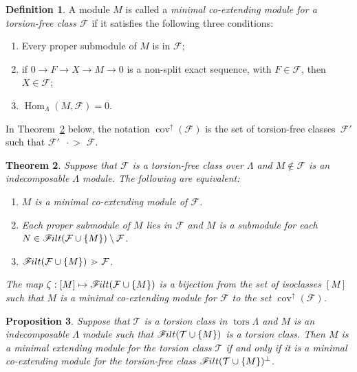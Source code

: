\documentclass[10pt]{amsart}
\providecommand{\1}{}
\DeclareMathOperator{\tors}{tors}
\DeclareMathOperator{\Hom}{Hom}
\DeclareMathOperator{\cov}{cov}
\newcommand{\calF}{\mathcal{F}}
\newcommand{\calT}{\mathcal{T}}
\newcommand{\filt}{\mathscr{F}\Mk ilt}
\newcommand{\covers}{{\,\,\,\cdot\!\!\!\! >\,\,}}
\newcommand{\covup}{\cov^{\uparrow}}
\renewcommand{\1}{\hat{1}}
\newcommand{\0}{\hat{0}}
\newcommand{\newword}[1]{\emph{#1}}
\newcommand*{\Mk}{\mkern -2mu}
\newtheorem{theorem}{Theorem}[section]
\newtheorem{proposition}[theorem]{Proposition}
\theoremstyle{definition}
\newtheorem{definition}[theorem]{Definition}
\begin{document}
\begin{definition}
A module $M$ is called a \newword{minimal co-extending module for a torsion-free class $\calF$} if it satisfies the following
three conditions:
\begin{enumerate}[label={(P\arabic*$'$)}]
\item \label{copropertyone} Every proper submodule of $M$ is
 in $\calF$;
\item \label{copropertytwo} if $0\rightarrow F \rightarrow X
 \rightarrow M \rightarrow 0$ is a non-split exact sequence, with
 $F\in \calF$, then $X\in \calF$;
\item\label{copropertythree} $\Hom_\Lambda(M,\calF)=0$.
\end{enumerate}
\end{definition}
In Theorem~\ref{prop:min-ext-module-free} below, the notation $\covup(\calF)$ is the set of torsion-free classes~$\calF'$ such that $\calF' \covers \calF$.
\begin{theorem}\label{prop:min-ext-module-free}
Suppose that $\calF$ is a torsion-free class over $\Lambda$ and $M\not\in \calF$ is an indecomposable $\Lambda$ module.
The following are equivalent:
\begin{enumerate}
\item $M$ is a minimal co-extending module of $\calF$.
\item Each proper submodule of $M$ lies in $\calF$ and $M$ is a submodule for each $N\in \filt(\calF\cup \{M\})\setminus \calF$.
\item $\filt(\calF \cup\{M\}) \covers \calF$.
\end{enumerate}
The map $\zeta: [M]\mapsto \filt(\calF\cup \{M\})$ is a bijection from the set of isoclasses $[M]$ such that $M$ is a minimal co-extending module for $\calF$ to the set $\covup(\calF)$.
\end{theorem}


\begin{proposition}\label{prop:torsion-free-to-torsion-relation}
Suppose that $\calT$ is a torsion class in $\tors \Lambda$ and $M$ is
an indecomposable $\Lambda$ module such that $\filt(\calT \cup \{M\})$
is a torsion class. Then $M$ is a minimal extending module for the torsion class $\calT$ if and only if it is a minimal co-extending module for the torsion-free class $\filt(\calT \cup\{M\})^\perp$.
\end{proposition}
\end{document}
